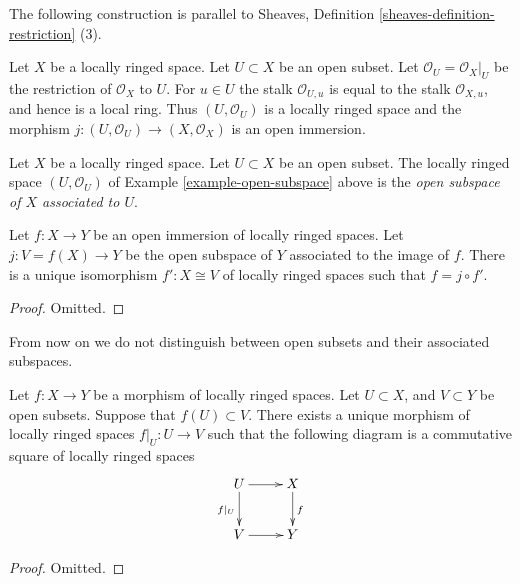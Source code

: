 \noindent
The following construction is parallel to
Sheaves, Definition \ref{sheaves-definition-restriction} (3).

\begin{example}
\label{example-open-subspace}
Let $X$ be a locally ringed space.
Let $U \subset X$ be an open subset.
Let $\mathcal{O}_U = \mathcal{O}_X|_U$
be the restriction of $\mathcal{O}_X$ to $U$.
For $u \in U$ the stalk $\mathcal{O}_{U, u}$
is equal to the stalk $\mathcal{O}_{X, u}$, and hence is a
local ring. Thus $(U, \mathcal{O}_U)$ is a locally ringed
space and the morphism $j : (U, \mathcal{O}_U) \to (X, \mathcal{O}_X)$
is an open immersion.
\end{example}

\begin{definition}
\label{definition-open-subspace}
Let $X$ be a locally ringed space.
Let $U \subset X$ be an open subset.
The locally ringed space $(U, \mathcal{O}_U)$
of Example \ref{example-open-subspace} above
is the {\it open subspace of $X$ associated to $U$}.
\end{definition}

\begin{lemma}
\label{lemma-open-immersion}
Let $f : X \to Y$ be an open immersion of
locally ringed spaces. Let $j : V = f(X) \to Y$
be the open subspace of $Y$ associated to the image of $f$.
There is a unique isomorphism $f' : X \cong V$ of
locally ringed spaces such that $f = j \circ f'$.
\end{lemma}

\begin{proof}
Omitted.
\end{proof}

\noindent
From now on we do not distinguish between open subsets
and their associated subspaces.

\begin{lemma}
\label{lemma-restrict-map-to-opens}
Let $f : X \to Y$ be a morphism of locally ringed spaces.
Let $U \subset X$, and $V \subset Y$ be open subsets.
Suppose that $f(U) \subset V$. There exists a unique
morphism of locally ringed spaces $f|_U : U \to V$ such
that the following diagram is a commutative square of
locally ringed spaces
$$
\xymatrix{
U \ar[d]_{f|_U} \ar[r] & X \ar[d]^f \\
V \ar[r] & Y
}
$$
\end{lemma}

\begin{proof}
Omitted.
\end{proof}

